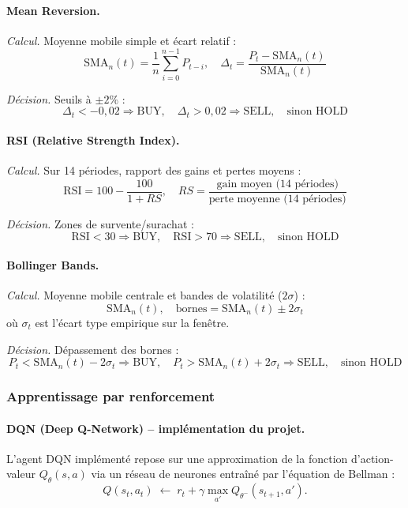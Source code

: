 \documentclass[11pt,a4paper]{article}
\begin{document}
\paragraph{Mean Reversion.}

\textit{Calcul.} Moyenne mobile simple et écart relatif :
$$\mathrm{SMA}_n(t)=\frac{1}{n}\sum_{i=0}^{n-1}P_{t-i}, \quad
\Delta_t=\frac{P_t-\mathrm{SMA}_n(t)}{\mathrm{SMA}_n(t)}$$

\textit{Décision.} Seuils à $\pm 2\%$ :
$$\Delta_t < -0{,}02 \Rightarrow \mathrm{BUY}, \quad
\Delta_t > 0{,}02 \Rightarrow \mathrm{SELL}, \quad
\text{sinon HOLD}$$

\paragraph{RSI (Relative Strength Index).}

\textit{Calcul.} Sur 14 périodes, rapport des gains et pertes moyens :
$$\mathrm{RSI}=100-\frac{100}{1+RS}, \quad
RS=\frac{\text{gain moyen (14 périodes)}}{\text{perte moyenne (14 périodes)}}$$

\textit{Décision.} Zones de survente/surachat :
$$\mathrm{RSI} < 30 \Rightarrow \mathrm{BUY}, \quad
\mathrm{RSI} > 70 \Rightarrow \mathrm{SELL}, \quad
\text{sinon HOLD}$$

\paragraph{Bollinger Bands.}

\textit{Calcul.} Moyenne mobile centrale et bandes de volatilité ($2\sigma$) :
$$\mathrm{SMA}_n(t), \quad \text{bornes} = \mathrm{SMA}_n(t) \pm 2\sigma_t$$
où $\sigma_t$ est l'écart type empirique sur la fenêtre.

\textit{Décision.} Dépassement des bornes :
$$P_t < \mathrm{SMA}_n(t)-2\sigma_t \Rightarrow \mathrm{BUY}, \quad
P_t > \mathrm{SMA}_n(t)+2\sigma_t \Rightarrow \mathrm{SELL}, \quad
\text{sinon HOLD}$$

\subsubsection{Apprentissage par renforcement}

\paragraph{DQN (Deep Q-Network) -- implémentation du projet.}

L'agent DQN implémenté repose sur une approximation de la fonction
d'action-valeur $Q_\theta(s,a)$ via un réseau de neurones entraîné
par l'équation de Bellman :
\[
Q(s_t,a_t) \;\leftarrow\; r_t + \gamma \max_{a'} Q_{\theta^-}(s_{t+1},a').
\]
\end{document}
